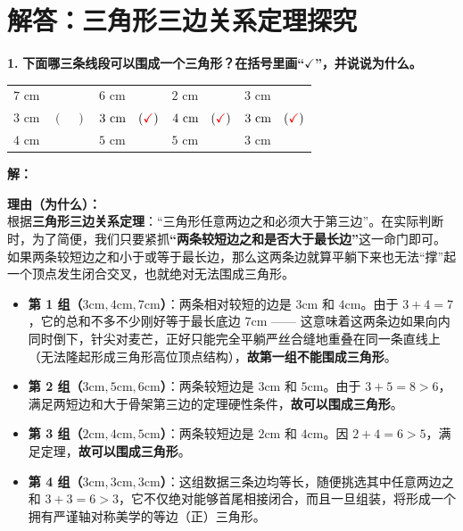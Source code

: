 \section{解答：三角形三边关系定理探究}

\vspace{0.6cm}

\textbf{\LARGE 1.} \textbf{下面哪三条线段可以围成一个三角形？在括号里画“$\checkmark$”，并说说为什么。}

\vspace{0.4cm}

\begin{center}
\renewcommand{\arraystretch}{1.5}
\setlength{\tabcolsep}{15pt}
\begin{tabular}{llll}
$7\text{ cm}$ & $6\text{ cm}$ & $2\text{ cm}$ & $3\text{ cm}$ \\
$3\text{ cm} \quad (\quad)$ & $3\text{ cm} \quad (\textcolor{red}{\checkmark})$ & $4\text{ cm} \quad (\textcolor{red}{\checkmark})$ & $3\text{ cm} \quad (\textcolor{red}{\checkmark})$ \\
$4\text{ cm}$ & $5\text{ cm}$ & $5\text{ cm}$ & $3\text{ cm}$ \\
\end{tabular}
\end{center}

\vspace{0.4cm}
\textbf{解：}

\textbf{理由（为什么）：} \\
根据\textbf{三角形三边关系定理}：“三角形任意两边之和必须大于第三边”。在实际判断时，为了简便，我们只要紧抓\textbf{“两条较短边之和是否大于最长边”}这一命门即可。如果两条较短边之和小于或等于最长边，那么这两条边就算平躺下来也无法“撑”起一个顶点发生闭合交叉，也就绝对无法围成三角形。
\begin{itemize}
    \item \textbf{第 1 组（$3\text{cm}, 4\text{cm}, 7\text{cm}$）}：两条相对较短的边是 $3\text{cm}$ 和 $4\text{cm}$。由于 $3 + 4 = 7$，它的总和不多不少刚好等于最长底边 $7\text{cm}$ —— 这意味着这两条边如果向内同时倒下，针尖对麦芒，正好只能完全平躺严丝合缝地重叠在同一条直线上（无法隆起形成三角形高位顶点结构），\textbf{故第一组不能围成三角形}。
    \item \textbf{第 2 组（$3\text{cm}, 5\text{cm}, 6\text{cm}$）}：两条较短边是 $3\text{cm}$ 和 $5\text{cm}$。由于 $3 + 5 = 8 > 6$，满足两短边和大于骨架第三边的定理硬性条件，\textbf{故可以围成三角形}。
    \item \textbf{第 3 组（$2\text{cm}, 4\text{cm}, 5\text{cm}$）}：两条较短边是 $2\text{cm}$ 和 $4\text{cm}$。因 $2 + 4 = 6 > 5$，满足定理，\textbf{故可以围成三角形}。
    \item \textbf{第 4 组（$3\text{cm}, 3\text{cm}, 3\text{cm}$）}：这组数据三条边均等长，随便挑选其中任意两边之和 $3 + 3 = 6 > 3$，它不仅绝对能够首尾相接闭合，而且一旦组装，将形成一个拥有严谨轴对称美学的等边（正）三角形。
\end{itemize}

